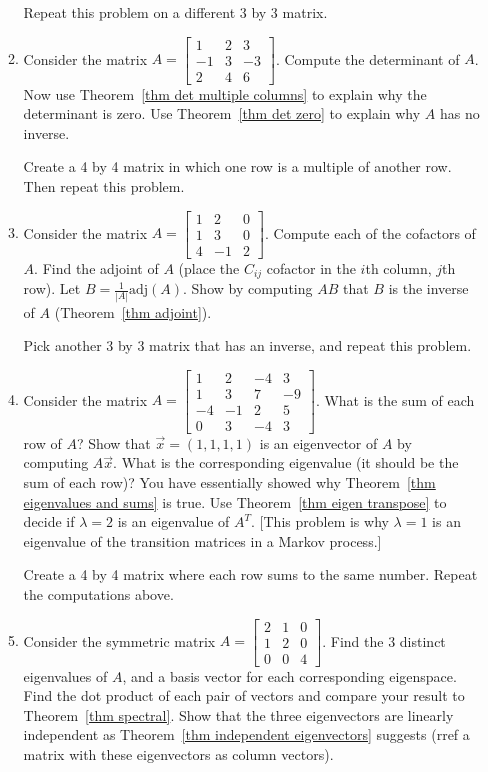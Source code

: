 \begin{enumerate}
\begin{enumerate}
Repeat this problem on a different 3 by 3 matrix.
  
  \item Consider the matrix 
  $A = 
\begin{bmatrix}
1&2&3\\
-1&3&-3\\
2&4&6
\end{bmatrix}
$. Compute the determinant of $A$.  Now use Theorem~\ref{thm det multiple columns} to explain why the determinant is zero. Use Theorem~\ref{thm det zero} to explain why $A$ has no inverse.
  
  Create a 4 by 4 matrix in which one row is a multiple of another row. Then repeat this problem. 
  
  \item Consider the matrix 
  $A = 
\begin{bmatrix}
1&2&0\\
1&3&0\\
4&-1&2
\end{bmatrix}
$. 
Compute each of the cofactors of $A$. Find the adjoint of $A$ (place the $C_{ij}$ cofactor in the $i$th column, $j$th row). Let $B=\frac{1}{|A|}\text{adj}(A)$. Show by computing $AB$ that $B$ is the inverse of $A$ (Theorem~\ref{thm adjoint}).

Pick another 3 by 3 matrix that has an inverse, and repeat this problem.
	

	\item Consider the matrix   $A = 
\begin{bmatrix}
1&2&-4&3\\
1&3&7&-9\\
-4&-1&2&5\\
0&3&-4&3
\end{bmatrix}
$. 
What is the sum of each row of $A$? Show that $\vec x = (1,1,1,1)$ is an eigenvector of $A$ by computing $A\vec x$. What is the corresponding eigenvalue (it should be the sum of each row)? You have essentially showed why Theorem~\ref{thm eigenvalues and sums} is true. Use Theorem~\ref{thm eigen transpose} to decide if $\lambda=2$ is an eigenvalue of $A^T$. [This problem is why $\lambda =1 $ is an eigenvalue of the transition matrices in a Markov process.]
	
	Create a 4 by 4 matrix where each row sums to the same number.  Repeat the computations above.
	
	\item Consider the symmetric matrix 
  $A = 
\begin{bmatrix}
2&1&0\\
1&2&0\\
0&0&4
\end{bmatrix}
$. 
Find the 3 distinct eigenvalues of $A$, and a basis vector for each corresponding eigenspace. Find the dot product of each pair of vectors and compare your result to Theorem~\ref{thm spectral}.  Show that the three eigenvectors are linearly independent  as Theorem~\ref{thm independent eigenvectors} suggests (rref a matrix with these eigenvectors as column vectors).


\end{enumerate}
\end{enumerate}
